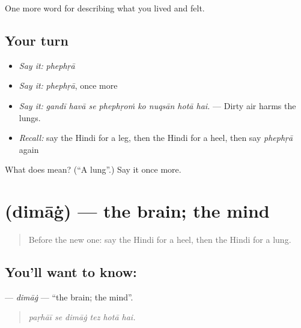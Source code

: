 \begin{grammarlens}[title={What you've built}]
One more word for describing what you lived and felt.
\end{grammarlens}

\subsection*{Your turn}
\begin{itemize}
\raggedright
  \item \emph{Say it:} \emph{phephṛā}
  \item \emph{Say it:} \emph{phephṛā}, once more
  \item \emph{Say it:} \emph{gandī havā se phephṛoṁ ko nuqsān hotā hai.} — Dirty air harms the lungs.
  \item \emph{Recall:} say the Hindi for a leg, then the Hindi for a heel, then say \emph{phephṛā} again
\end{itemize}

\begin{tcolorbox}[breakable,colback=teal!4,colframe=teal!35!black,title={Before you move on}]
What does  mean? (\textquotedblleft{}A lung\textquotedblright{}.) Say it once more.
\end{tcolorbox}
\section[\texorpdfstring{\hi{दिमाग़} (dimāġ)}{दिमाग़ (dimāġ)}]{ (dimāġ) — the brain; the mind}

\label{lesson:HI-C478-dimag}



\begin{quote}
Before the new one: say the Hindi for a heel, then the Hindi for a lung.
\end{quote}

\subsection*{You'll want to know: }
\textbf{} — \emph{dimāġ} — \textquotedblleft{}the brain; the mind\textquotedblright{}.

\begin{quote}
     
\end{quote}

\begin{quote}
\emph{paṛhāī se dimāġ tez hotā hai.}
\end{quote}

